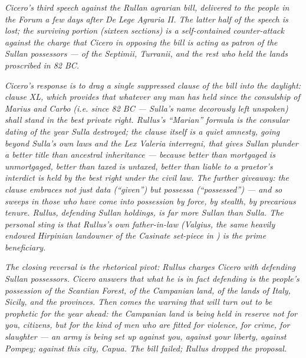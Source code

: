 
\textit{Cicero's third speech against the Rullan agrarian
bill, delivered to the people in the Forum a few days after
\textit{De Lege Agraria II}. The latter half of the speech is
lost; the surviving portion (sixteen sections) is a self-contained
counter-attack against the charge that Cicero in opposing the
bill is acting as patron of the Sullan possessors --- of the
Septimii, Turranii, and the rest who held the lands proscribed
in 82 BC.}

\textit{Cicero's response is to drag a single suppressed
clause of the bill into the daylight: clause XL, which
provides that whatever any man has held since the consulship of
Marius and Carbo (i.e. since 82 BC --- Sulla's name decorously
left unspoken) shall stand in the best private right.
Rullus's ``Marian'' formula is the consular dating of the year
Sulla destroyed; the clause itself is a quiet amnesty, going
beyond Sulla's own laws and the Lex Valeria interregni, that
gives Sullan plunder a better title than ancestral inheritance
--- because better than mortgaged is unmortgaged, better than
taxed is untaxed, better than liable to a praetor's interdict
is held by the best right under the civil law. The further
giveaway: the clause embraces not just \textit{data}
(``given'') but \textit{possessa} (``possessed'') --- and so
sweeps in those who have come into possession by force, by
stealth, by precarious tenure. Rullus, defending Sullan
holdings, is far more Sullan than Sulla. The personal sting
is that Rullus's own father-in-law (Valgius, the same heavily
endowed Hirpinian landowner of the Casinate set-piece in
) is the prime beneficiary.}

\textit{The closing reversal is the rhetorical pivot: Rullus
charges Cicero with defending Sullan possessors. Cicero answers
that what he is in fact defending is the people's possession of
the Scantian Forest, of the Campanian land, of the lands of
Italy, Sicily, and the provinces. Then comes the warning that
will turn out to be prophetic for the year ahead: the
Campanian land is being held in reserve not for you, citizens,
but for the kind of men who are fitted for violence, for
crime, for slaughter --- an army is being set up against you,
against your liberty, against Pompey; against this city,
Capua. The bill failed; Rullus dropped the proposal.}
